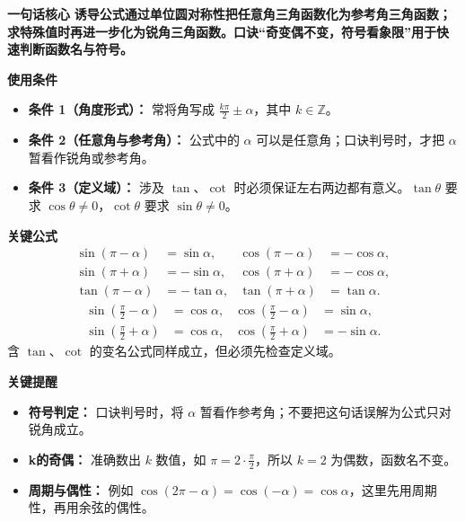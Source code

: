 \begin{summarybox}
\textbf{\textcolor{CSummary}{一句话核心}}
\textbf{诱导公式通过单位圆对称性把任意角三角函数化为参考角三角函数；求特殊值时再进一步化为锐角三角函数。口诀“奇变偶不变，符号看象限”用于快速判断函数名与符号。}

\medskip
\textbf{\textcolor{CSummary}{使用条件}}
\begin{itemize}[leftmargin=*, itemsep=0.5em, topsep=0.4em]
    \item \textbf{条件 1（角度形式）：} 常将角写成 $\frac{k\pi}{2}\pm\alpha$，其中 $k\in\mathbb{Z}$。
    \item \textbf{条件 2（任意角与参考角）：} 公式中的 $\alpha$ 可以是任意角；口诀判号时，才把 $\alpha$ 暂看作锐角或参考角。
    \item \textbf{条件 3（定义域）：} 涉及 $\tan$、$\cot$ 时必须保证左右两边都有意义。$\tan\theta$ 要求 $\cos\theta\neq0$，$\cot\theta$ 要求 $\sin\theta\neq0$。
\end{itemize}

\medskip
\textbf{\textcolor{CSummary}{关键公式}}
\[
\begin{aligned}
\sin(\pi-\alpha)&=\sin\alpha, & \cos(\pi-\alpha)&=-\cos\alpha,\\
\sin(\pi+\alpha)&=-\sin\alpha, & \cos(\pi+\alpha)&=-\cos\alpha,\\
\tan(\pi-\alpha)&=-\tan\alpha, & \tan(\pi+\alpha)&=\tan\alpha.
\end{aligned}
\]
\[
\begin{aligned}
\sin\left(\frac{\pi}{2}-\alpha\right)&=\cos\alpha, &
\cos\left(\frac{\pi}{2}-\alpha\right)&=\sin\alpha,\\
\sin\left(\frac{\pi}{2}+\alpha\right)&=\cos\alpha, &
\cos\left(\frac{\pi}{2}+\alpha\right)&=-\sin\alpha.
\end{aligned}
\]
含 $\tan$、$\cot$ 的变名公式同样成立，但必须先检查定义域。

\medskip
\textbf{\textcolor{CSummary}{关键提醒}}
\begin{itemize}[leftmargin=*, itemsep=0.5em, topsep=0.4em]
    \item \textbf{符号判定：} 口诀判号时，将 $\alpha$ 暂看作参考角；不要把这句话误解为公式只对锐角成立。
    \item \textbf{k的奇偶：} 准确数出 $k$ 数值，如 $\pi=2\cdot\frac{\pi}{2}$，所以 $k=2$ 为偶数，函数名不变。
    \item \textbf{周期与偶性：} 例如 $\cos(2\pi-\alpha)=\cos(-\alpha)=\cos\alpha$，这里先用周期性，再用余弦的偶性。
\end{itemize}
\end{summarybox}
